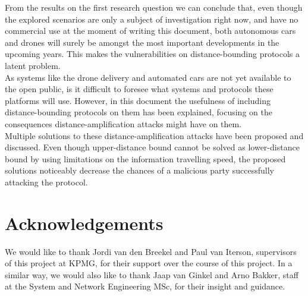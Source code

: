 \documentclass{article}
\begin{document}
From the results on the first research question we can conclude that, even though the explored scenarios are only a subject of investigation right now, and have no commercial use at the moment of writing this document, both autonomous cars and drones will surely be amongst the most important developments in the upcoming years. This makes the vulnerabilities on distance-bounding protocols a latent problem.\\

As systems like the drone delivery and automated cars are not yet available to the open public, is it difficult to foresee what systems and protocols these platforms will use. However, in this document the usefulness of including distance-bounding protocols on them has been explained, focusing on the consequences distance-amplification attacks might have on them.\\

Multiple solutions to these distance-amplification attacks have been proposed and discussed. Even though upper-distance bound cannot be solved as lower-distance bound by using limitations on the information travelling speed, the proposed solutions noticeably decrease the chances of a malicious party successfully attacking the protocol.\\




















\section{Acknowledgements}
\label{sec:acknowledgements}

We would like to thank Jordi van den Breekel and Paul van Iterson, supervisors of this project at KPMG, for their support over the course of this project. In a similar way, we would also like to thank Jaap van Ginkel and Arno Bakker, staff at the System and Network Engineering MSc, for their insight and guidance.\\







\printbibliography


\end{document}
